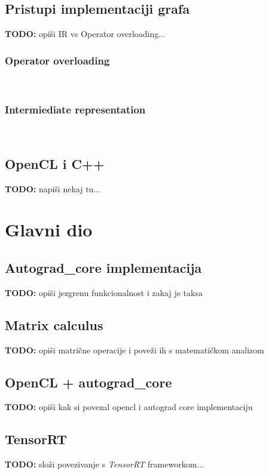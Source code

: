 \documentclass[zavrsnirad]{fer}
\begin{document}
\section{Pristupi implementaciji grafa}
\textbf{TODO:} opiši IR vs Operator overloading...
\subsection{Operator overloading}
\blindtext
\\
\subsection{Intermiediate representation}
\blindtext
\\

\section{OpenCL i C++}
\textbf{TODO:} napiši nekaj tu...
\\
\blindtext


\chapter{Glavni dio}
\label{pog:glavni_dio}

\section{Autograd\_core implementacija}
\textbf{TODO:} opiši jezgrenu funkcionalnost i zakaj je taksa
\blindtext

\section{Matrix calculus}
\textbf{TODO:} opiši matrične operacije i poveži ih s matematičkom analizom
\blindtext

\section{OpenCL + autograd\_core}
\textbf{TODO:} opiši kak si povezal opencl i autograd core implementaciju
\blindtext

\section{TensorRT}
\textbf{TODO:} složi povezivanje s \textit{TensorRT} frameworkom...
\blindtext
\end{document}
